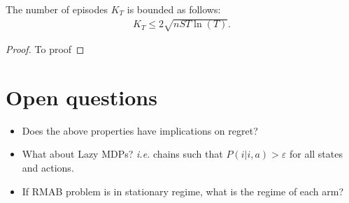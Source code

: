 \begin{lem}
    \label{lem:nb_episodes}
    The number of episodes $K_T$ is bounded as follows:
    \begin{align}
        K_T\le2\sqrt{nST\ln(T)}.
    \end{align}
\end{lem}
\begin{proof}
    To proof
\end{proof}


\section{Open questions}

\begin{itemize}
    \item Does the above properties have implications on regret? 
    \item What about Lazy MDPs? \emph{i.e.} chains such that $P(i | i,a)>\varepsilon$ for all states and actions.
    \item If RMAB problem is in stationary regime, what is the regime of each arm?
\end{itemize}

\endgroup
